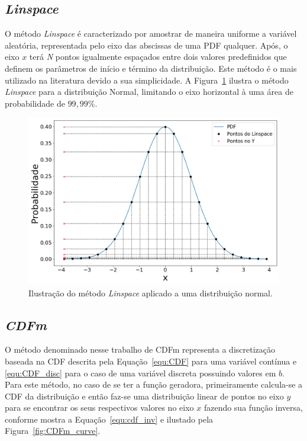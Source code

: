 \subsection{\textit{Linspace}}
O método \textit{Linspace} é caracterizado por amostrar de maneira uniforme a variável aleatória, representada pelo eixo das abscissas de uma \ac{PDF} qualquer. Após, o eixo $ x $ terá \textit{N} pontos igualmente espaçados entre dois valores predefinidos que definem os parâmetros de início e término da distribuição. Este método é o mais utilizado na literatura devido a sua simplicidade. A Figura~\ref{fig:linspace_curve} ilustra o método \textit{Linspace} para a distribuição Normal, limitando o eixo horizontal à uma área de probabilidade de $99,99\%$.


\begin{figure}[H]
	\centering
	\includegraphics[width=0.7\linewidth]{./figuras/normal_1}
	\caption{Ilustração do método \textit{Linspace} aplicado a uma distribuição normal.}
	\label{fig:linspace_curve}
\end{figure}


\subsection{\textit{CDFm}}
O método denominado nesse trabalho de \ac{CDFm} representa a discretização baseada na \ac{CDF} descrita pela Equação~\eqref{equ:CDF} para uma variável contínua e \eqref{equ:CDF_disc} para o caso de uma variável discreta possuindo valores em $ b $. Para este método, no caso de se ter a função geradora, primeiramente calcula-se a \ac{CDF} da distribuição e então faz-se uma distribuição linear de pontos no eixo $ y $ para se encontrar os seus respectivos valores no eixo $ x $ fazendo sua função inversa, conforme mostra a Equação~\eqref{equ:cdf_inv} e ilustado pela Figura~\ref{fig:CDFm_curve}.



